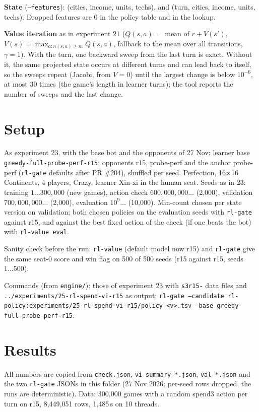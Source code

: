 \documentclass{../polyexp}
\begin{document}
\textbf{State} (\texttt{--features}): (cities, income, units, techs), and (turn, cities, income, units, techs).
Dropped features are 0 in the policy table and in the lookup.

\textbf{Value iteration} as in experiment 21 ($Q(s,a) = $ mean of $r + V(s')$, $V(s) = \max_{a: n(s,a) \ge m}
Q(s,a)$, fallback to the mean over all transitions, $\gamma = 1$). With the turn, one backward sweep from the last
turn is exact. Without it, the same projected state occurs at different turns and can lead back to itself, so the
sweeps repeat (Jacobi, from $V = 0$) until the largest change is below $10^{-6}$, at most 30 times (the game's length
in learner turns); the tool reports the number of sweeps and the last change.

\section{Setup}
As experiment 23, with the base bot and the opponents of 27 Nov: learner base \texttt{greedy-full-probe-perf-r15};
opponents r15, probe-perf and the anchor probe-perf (\texttt{rl-gate} defaults after PR \#204), shuffled per seed.
Perfection, 16$\times$16 Continents, 4 players, Crazy, learner Xin-xi in the human seat. Seeds as in 23: training
$1\dots300{,}000$ (new games), action check $600{,}000{,}000\dots$ (2{,}000), validation $700{,}000{,}000\dots$
(2{,}000), evaluation $10^9\dots$ (10{,}000). Min-count chosen per state version on validation; both chosen policies
on the evaluation seeds with \texttt{rl-gate} against r15, and against the best fixed action of the check (if one
beats the bot) with \texttt{rl-value eval}.

Sanity check before the run: \texttt{rl-value} (default model now r15) and \texttt{rl-gate} give the same seat-0
score and win flag on 500 of 500 seeds (r15 against r15, seeds $1\dots500$).

Commands (from \texttt{engine/}): those of experiment 23 with \texttt{s3r15-} data files and
\texttt{../experiments/25-rl-spend-vi-r15} as output; \texttt{rl-gate --candidate
rl-policy:experiments/25-rl-spend-vi-r15/policy-<v>.tsv --base greedy-full-probe-perf-r15}.

\section{Results}
\ExpResults

All numbers are copied from \texttt{check.json}, \texttt{vi-summary-*.json}, \texttt{val-*.json} and the two
\texttt{rl-gate} JSONs in this folder (27 Nov 2026; per-seed rows dropped, the runs are deterministic). Data: 300{,}000
games with a random spend3 action per turn on r15, 8{,}449{,}051 rows, 1{,}485\,s on 10 threads.
\end{document}
